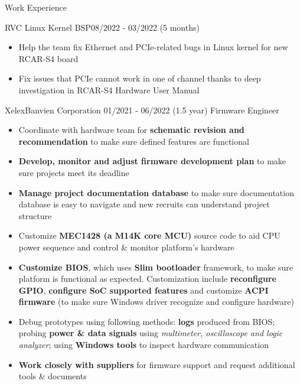 \documentclass{resume} %
\begin{document}
\begin{rSection}{Work Experience}
\begin{rCompanySubsection}
        \begin{rProjectSubsubsectionV2}{RVC Linux Kernel BSP}{08/2022 - 03/2022 (5 months)} {
        }{
            \begin{itemize}
                \item Help the team fix Ethernet and PCIe-related bugs in Linux kernel for new RCAR-S4 board
            \end{itemize}
        }{
            \begin{itemize}
                \item Fix issues that PCIe cannot work in one of channel thanks to deep investigation in RCAR-S4 Hardware User Manual
            \end{itemize}
        }
        \end{rProjectSubsubsectionV2}
    \end{rCompanySubsection}
\begin{rCompanySubsection}
    {XelexBanvien Corporation}
    {01/2021 - 06/2022 (1.5 year)}
    {Firmware Engineer}
    {}

\begin{itemize}
     \item Coordinate with hardware team for \textbf{schematic revision and recommendation} to make sure defined features are functional
     \item \textbf{Develop, monitor and adjust firmware development plan} to make sure projects meet its deadline
     \item \textbf{Manage project documentation database} to make sure documentation database is easy to navigate and new recruits can understand project structure
     \item Customize \textbf{MEC1428 (a M14K core MCU)} source code to aid CPU power sequence and control \& monitor platform's hardware
     \item \textbf{Customize BIOS}, which uses {\bf Slim bootloader} framework, to make sure platform is functional as expected. Customization include \textbf{reconfigure GPIO}, \textbf{configure SoC supported features} and customize \textbf{ACPI firmware} (to make sure Windows driver recognize and configure hardware)
     \item Debug prototypes using following methods: \textbf{logs} produced from BIOS; probing \textbf{power \& data signals} using \textit{multimeter, oscilloscope and logic analyzer}; using \textbf{Windows tools} to inspect hardware communication
     \item \textbf{Work closely with suppliers} for firmware support and request additional tools \& documents


\end{itemize}
\end{rCompanySubsection}
\end{rSection}
\end{document}
